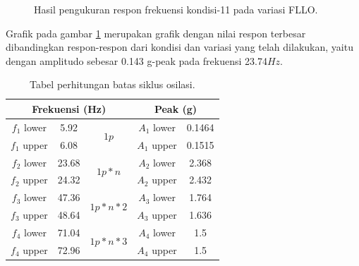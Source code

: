 \begin{figure}[H]
	\centering
	\caption{Hasil pengukuran respon frekuensi kondisi-11 pada variasi FLLO.}
	\label{fig:11_FLLO}
\end{figure}

Grafik pada gambar \ref{fig:11_FLLO} merupakan grafik dengan nilai respon terbesar dibandingkan respon-respon dari kondisi dan variasi yang telah dilakukan, yaitu dengan amplitudo sebesar 0.143 g-peak pada frekuensi 23.74$Hz$. 

\begin{table}[]
	\caption{Tabel perhitungan batas siklus osilasi.}
	\label{tb:batas_siklus}
	\centering
	\begin{tabular}{|ccc|cc|}
		\hline
		\multicolumn{3}{|c|}{Frekuensi (Hz)}                                                       & \multicolumn{2}{c|}{Peak (g)}             \\ \hline
		\multicolumn{1}{|c|}{$f_1$ lower} & \multicolumn{1}{c|}{5.92}  & \multirow{2}{*}{$1p$}       & \multicolumn{1}{c|}{$A_1$ lower} & 0.1464 \\ \cline{1-2} \cline{4-5} 
		\multicolumn{1}{|c|}{$f_1$ upper} & \multicolumn{1}{c|}{6.08}  &                           & \multicolumn{1}{c|}{$A_1$ upper} & 0.1515 \\ \hline
		\multicolumn{1}{|c|}{$f_2$ lower} & \multicolumn{1}{c|}{23.68} & \multirow{2}{*}{$1p*n$}   & \multicolumn{1}{c|}{$A_2$ lower} & 2.368  \\ \cline{1-2} \cline{4-5} 
		\multicolumn{1}{|c|}{$f_2$ upper} & \multicolumn{1}{c|}{24.32} &                           & \multicolumn{1}{c|}{$A_2$ upper} & 2.432  \\ \hline
		\multicolumn{1}{|c|}{$f_3$ lower} & \multicolumn{1}{c|}{47.36} & \multirow{2}{*}{$1p*n*2$} & \multicolumn{1}{c|}{$A_3$ lower} & 1.764 \\ \cline{1-2} \cline{4-5} 
		\multicolumn{1}{|c|}{$f_3$ upper} & \multicolumn{1}{c|}{48.64} &                           & \multicolumn{1}{c|}{$A_3$ upper} & 1.636  \\ \hline
		\multicolumn{1}{|c|}{$f_4$ lower} & \multicolumn{1}{c|}{71.04} & \multirow{2}{*}{$1p*n*3$} & \multicolumn{1}{c|}{$A_4$ lower} & 1.5    \\ \cline{1-2} \cline{4-5} 
		\multicolumn{1}{|c|}{$f_4$ upper} & \multicolumn{1}{c|}{72.96} &                           & \multicolumn{1}{c|}{$A_4$ upper} & 1.5    \\ \hline
	\end{tabular}
\end{table}

